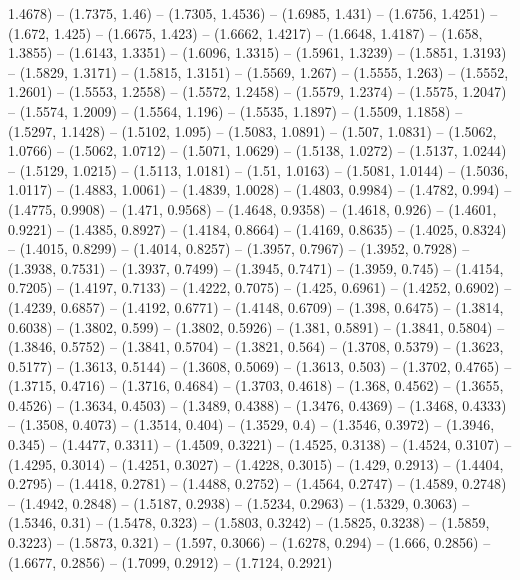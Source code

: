 {   1.4678) -- (1.7375, 1.46) -- (1.7305, 1.4536) -- (1.6985, 1.431) -- (1.6756, 
  1.4251) -- (1.672, 1.425) -- (1.6675, 1.423) -- (1.6662, 1.4217) -- (1.6648, 
  1.4187) -- (1.658, 1.3855) -- (1.6143, 1.3351) -- (1.6096, 1.3315) -- (1.5961,
   1.3239) -- (1.5851, 1.3193) -- (1.5829, 1.3171) -- (1.5815, 1.3151) -- 
  (1.5569, 1.267) -- (1.5555, 1.263) -- (1.5552, 1.2601) -- (1.5553, 1.2558) -- 
  (1.5572, 1.2458) -- (1.5579, 1.2374) -- (1.5575, 1.2047) -- (1.5574, 1.2009) 
  -- (1.5564, 1.196) -- (1.5535, 1.1897) -- (1.5509, 1.1858) -- (1.5297, 1.1428)
   -- (1.5102, 1.095) -- (1.5083, 1.0891) -- (1.507, 1.0831) -- (1.5062, 1.0766)
   -- (1.5062, 1.0712) -- (1.5071, 1.0629) -- (1.5138, 1.0272) -- (1.5137, 
  1.0244) -- (1.5129, 1.0215) -- (1.5113, 1.0181) -- (1.51, 1.0163) -- (1.5081, 
  1.0144) -- (1.5036, 1.0117) -- (1.4883, 1.0061) -- (1.4839, 1.0028) -- 
  (1.4803, 0.9984) -- (1.4782, 0.994) -- (1.4775, 0.9908) -- (1.471, 0.9568) -- 
  (1.4648, 0.9358) -- (1.4618, 0.926) -- (1.4601, 0.9221) -- (1.4385, 0.8927) --
   (1.4184, 0.8664) -- (1.4169, 0.8635) -- (1.4025, 0.8324) -- (1.4015, 0.8299) 
  -- (1.4014, 0.8257) -- (1.3957, 0.7967) -- (1.3952, 0.7928) -- (1.3938, 
  0.7531) -- (1.3937, 0.7499) -- (1.3945, 0.7471) -- (1.3959, 0.745) -- (1.4154,
   0.7205) -- (1.4197, 0.7133) -- (1.4222, 0.7075) -- (1.425, 0.6961) -- 
  (1.4252, 0.6902) -- (1.4239, 0.6857) -- (1.4192, 0.6771) -- (1.4148, 0.6709) 
  -- (1.398, 0.6475) -- (1.3814, 0.6038) -- (1.3802, 0.599) -- (1.3802, 0.5926) 
  -- (1.381, 0.5891) -- (1.3841, 0.5804) -- (1.3846, 0.5752) -- (1.3841, 0.5704)
   -- (1.3821, 0.564) -- (1.3708, 0.5379) -- (1.3623, 0.5177) -- (1.3613, 
  0.5144) -- (1.3608, 0.5069) -- (1.3613, 0.503) -- (1.3702, 0.4765) -- (1.3715,
   0.4716) -- (1.3716, 0.4684) -- (1.3703, 0.4618) -- (1.368, 0.4562) -- 
  (1.3655, 0.4526) -- (1.3634, 0.4503) -- (1.3489, 0.4388) -- (1.3476, 0.4369) 
  -- (1.3468, 0.4333) -- (1.3508, 0.4073) -- (1.3514, 0.404) -- (1.3529, 0.4) --
   (1.3546, 0.3972) -- (1.3946, 0.345) -- (1.4477, 0.3311) -- (1.4509, 0.3221) 
  -- (1.4525, 0.3138) -- (1.4524, 0.3107) -- (1.4295, 0.3014) -- (1.4251, 
  0.3027) -- (1.4228, 0.3015) -- (1.429, 0.2913) -- (1.4404, 0.2795) -- (1.4418,
   0.2781) -- (1.4488, 0.2752) -- (1.4564, 0.2747) -- (1.4589, 0.2748) -- 
  (1.4942, 0.2848) -- (1.5187, 0.2938) -- (1.5234, 0.2963) -- (1.5329, 0.3063) 
  -- (1.5346, 0.31) -- (1.5478, 0.323) -- (1.5803, 0.3242) -- (1.5825, 0.3238) 
  -- (1.5859, 0.3223) -- (1.5873, 0.321) -- (1.597, 0.3066) -- (1.6278, 0.294) 
  -- (1.666, 0.2856) -- (1.6677, 0.2856) -- (1.7099, 0.2912) -- (1.7124, 0.2921)
}
